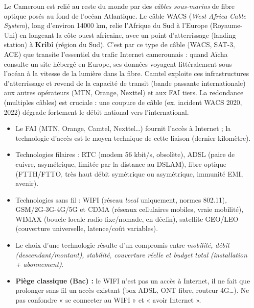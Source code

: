 \documentclass[11pt]{article}
\newcommand{\cle}[1]{{\popxbold\color{popdark}#1}}
\begin{document}
\begin{savaistu}
Le Cameroun est relié au reste du monde par des \emph{câbles sous-marins} de fibre optique posés au fond de l'océan Atlantique. Le câble \cle{WACS} (\emph{West Africa Cable System}), long d'environ \num{14000} km, relie l'Afrique du Sud à l'Europe (Royaume-Uni) en longeant la côte ouest africaine, avec un point d'atterrissage (landing station) à \textbf{Kribi} (région du Sud). C'est par ce type de câble (WACS, SAT-3, ACE) que transite l'essentiel du trafic Internet camerounais : quand Aïcha consulte un site hébergé en Europe, ses données voyagent littéralement sous l'océan à la vitesse de la lumière dans la fibre. Camtel exploite ces infrastructures d'atterrissage et revend de la capacité de transit (bande passante internationale) aux autres opérateurs (MTN, Orange, Nexttel) et aux FAI tiers. La redondance (multiples câbles) est cruciale : une coupure de câble (ex. incident WACS 2020, 2022) dégrade fortement le débit national vers l'international.
\end{savaistu}

\begin{aretenir}
\begin{itemize}
\item Le \cle{FAI} (MTN, Orange, Camtel, Nexttel\ldots) fournit l'accès à Internet ; la \cle{technologie d'accès} est le moyen technique de cette liaison (dernier kilomètre).
\item Technologies \cle{filaires} : RTC (modem 56 kbit/s, obsolète), ADSL (paire de cuivre, asymétrique, limitée par la distance au DSLAM), fibre optique (FTTH/FTTO, très haut débit symétrique ou asymétrique, immunité EMI, avenir).
\item Technologies \cle{sans fil} : WIFI (réseau \emph{local} uniquement, normes 802.11), GSM/2G-3G-4G/5G et CDMA (réseaux cellulaires mobiles, vraie mobilité), WIMAX (boucle locale radio fixe/nomade, en déclin), satellite GEO/LEO (couverture universelle, latence/coût variables).
\item Le choix d'une technologie résulte d'un compromis entre \emph{mobilité, débit (descendant/montant), stabilité, couverture réelle et budget total (installation + abonnement)}.
\item \textbf{Piège classique (Bac) :} le WIFI n'est pas un accès à Internet, il ne fait que prolonger sans fil un accès existant (box ADSL, ONT fibre, routeur 4G\ldots). Ne pas confondre « se connecter au WIFI » et « avoir Internet ».
\end{itemize}
\end{aretenir}
\end{document}
